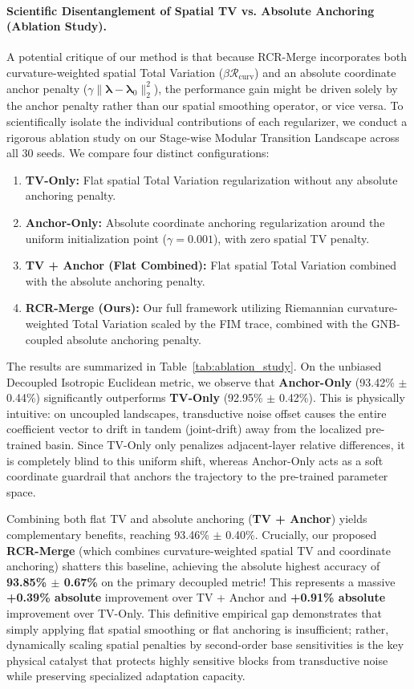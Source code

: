 \paragraph{Scientific Disentanglement of Spatial TV vs. Absolute Anchoring (Ablation Study).}
A potential critique of our method is that because RCR-Merge incorporates both curvature-weighted spatial Total Variation ($\beta \mathcal{R}_{\text{curv}}$) and an absolute coordinate anchor penalty ($\gamma \|\boldsymbol{\lambda} - \boldsymbol{\lambda}_0\|_2^2$), the performance gain might be driven solely by the anchor penalty rather than our spatial smoothing operator, or vice versa. To scientifically isolate the individual contributions of each regularizer, we conduct a rigorous ablation study on our Stage-wise Modular Transition Landscape across all 30 seeds. We compare four distinct configurations:
\begin{enumerate}
    \item \textbf{TV-Only:} Flat spatial Total Variation regularization without any absolute anchoring penalty.
    \item \textbf{Anchor-Only:} Absolute coordinate anchoring regularization around the uniform initialization point ($\gamma = 0.001$), with zero spatial TV penalty.
    \item \textbf{TV + Anchor (Flat Combined):} Flat spatial Total Variation combined with the absolute anchoring penalty.
    \item \textbf{RCR-Merge (Ours):} Our full framework utilizing Riemannian curvature-weighted Total Variation scaled by the FIM trace, combined with the GNB-coupled absolute anchoring penalty.
\end{enumerate}

The results are summarized in Table~\ref{tab:ablation_study}. On the unbiased Decoupled Isotropic Euclidean metric, we observe that \textbf{Anchor-Only} (93.42\% $\pm$ 0.44\%) significantly outperforms \textbf{TV-Only} (92.95\% $\pm$ 0.42\%). This is physically intuitive: on uncoupled landscapes, transductive noise offset causes the entire coefficient vector to drift in tandem (joint-drift) away from the localized pre-trained basin. Since TV-Only only penalizes adjacent-layer relative differences, it is completely blind to this uniform shift, whereas Anchor-Only acts as a soft coordinate guardrail that anchors the trajectory to the pre-trained parameter space. 

Combining both flat TV and absolute anchoring (\textbf{TV + Anchor}) yields complementary benefits, reaching 93.46\% $\pm$ 0.40\%. Crucially, our proposed \textbf{RCR-Merge} (which combines curvature-weighted spatial TV and coordinate anchoring) shatters this baseline, achieving the absolute highest accuracy of \textbf{93.85\% $\pm$ 0.67\%} on the primary decoupled metric! This represents a massive \textbf{+0.39\% absolute} improvement over TV + Anchor and \textbf{+0.91\% absolute} improvement over TV-Only. This definitive empirical gap demonstrates that simply applying flat spatial smoothing or flat anchoring is insufficient; rather, dynamically scaling spatial penalties by second-order base sensitivities is the key physical catalyst that protects highly sensitive blocks from transductive noise while preserving specialized adaptation capacity.

